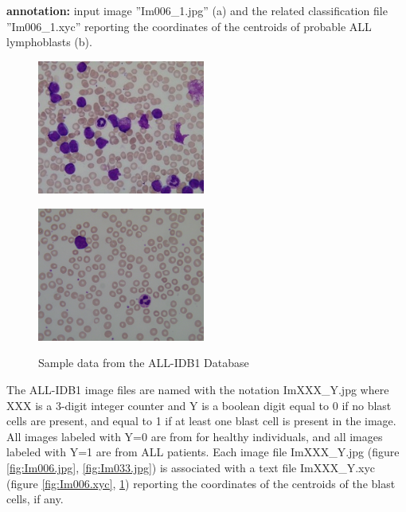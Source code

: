 \textbf{annotation:} input image ''Im006\_1.jpg'' (a) and the related classification file ''Im006\_1.xyc'' reporting the coordinates of the centroids of probable ALL lymphoblasts (b).

\begin{figure}[H]
\begin{minipage}[b]{0.35\linewidth}
\centering
\includegraphics[width=55mm]{../images/Im006_1.jpg}
\label{fig:Im006.jpg}
\end{minipage}
\hfill
\begin{minipage}[b]{0.3\linewidth}
\centering

\label{fig:Im006.xyc}
\end{minipage}

\begin{minipage}[b]{0.35\linewidth}
\centering
\includegraphics[width=55mm]{../images/Im033_1.jpg}
\label{fig:Im033.jpg}
\end{minipage}
\hfill
\begin{minipage}[b]{0.3\linewidth}
\centering

\label{fig:Im033.xyc}
\end{minipage}
\caption{Sample data from the ALL-IDB1 Database}
\end{figure}

The ALL-IDB1 image files are named with the notation ImXXX\_Y.jpg where XXX is a 3-digit integer counter and Y is a boolean digit equal to 0 if no blast cells are present, and equal to 1 if at least one blast cell is present in the image. All images labeled with Y=0 are from for healthy individuals, and all images labeled with Y=1 are from ALL patients. Each image file ImXXX\_Y.jpg (figure \ref{fig:Im006.jpg}, \ref{fig:Im033.jpg}) is associated with a text file ImXXX\_Y.xyc (figure \ref{fig:Im006.xyc}, \ref{fig:Im033.xyc}) reporting the coordinates of the centroids of the blast cells, if any.\\


